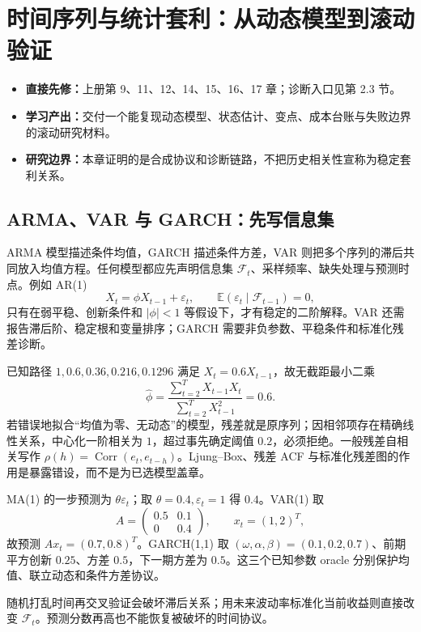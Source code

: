 \chapter{时间序列与统计套利：从动态模型到滚动验证}

\begin{itemize}
  \item \textbf{直接先修：}上册第 9、11、12、14、15、16、17 章；诊断入口见第 2.3 节。
  \item \textbf{学习产出：}交付一个能复现动态模型、状态估计、变点、成本台账与失败边界的滚动研究材料。
  \item \textbf{研究边界：}本章证明的是合成协议和诊断链路，不把历史相关性宣称为稳定套利关系。
\end{itemize}

\section{ARMA、VAR 与 GARCH：先写信息集}

ARMA 模型描述条件均值，GARCH 描述条件方差，VAR 则把多个序列的滞后共同放入均值方程。任何模型都应先声明信息集 $\mathcal F_t$、采样频率、缺失处理与预测时点。例如 AR(1)
\[
X_t=\phi X_{t-1}+\varepsilon_t,
\qquad \mathbb E(\varepsilon_t\mid\mathcal F_{t-1})=0,
\]
只有在弱平稳、创新条件和 $|\phi|<1$ 等假设下，才有稳定的二阶解释。VAR 还需报告滞后阶、稳定根和变量排序；GARCH 需要非负参数、平稳条件和标准化残差诊断。

已知路径 $1,0.6,0.36,0.216,0.1296$ 满足 $X_t=0.6X_{t-1}$，故无截距最小二乘
\[
\widehat\phi=\frac{\sum_{t=2}^T X_{t-1}X_t}{\sum_{t=2}^T X_{t-1}^2}=0.6.
\]
若错误地拟合“均值为零、无动态”的模型，残差就是原序列；因相邻项存在精确线性关系，中心化一阶相关为 $1$，超过事先确定阈值 $0.2$，必须拒绝。一般残差自相关写作 $\rho(h)=\operatorname{Corr}(e_t,e_{t-h})$。Ljung--Box、残差 ACF 与标准化残差图的作用是暴露错设，而不是为已选模型盖章。

MA(1) 的一步预测为 $\theta\varepsilon_t$；取 $\theta=0.4,\varepsilon_t=1$ 得 $0.4$。VAR(1) 取
\[
A=\begin{pmatrix}0.5&0.1\\0&0.4\end{pmatrix},\qquad x_t=(1,2)^T,
\]
故预测 $Ax_t=(0.7,0.8)^T$。GARCH(1,1) 取 $(\omega,\alpha,\beta)=(0.1,0.2,0.7)$、前期平方创新 $0.25$、方差 $0.5$，下一期方差为 $0.5$。这三个已知参数 oracle 分别保护均值、联立动态和条件方差协议。

\begin{diagnostic}
随机打乱时间再交叉验证会破坏滞后关系；用未来波动率标准化当前收益则直接改变 $\mathcal F_t$。预测分数再高也不能恢复被破坏的时间协议。
\end{diagnostic}


